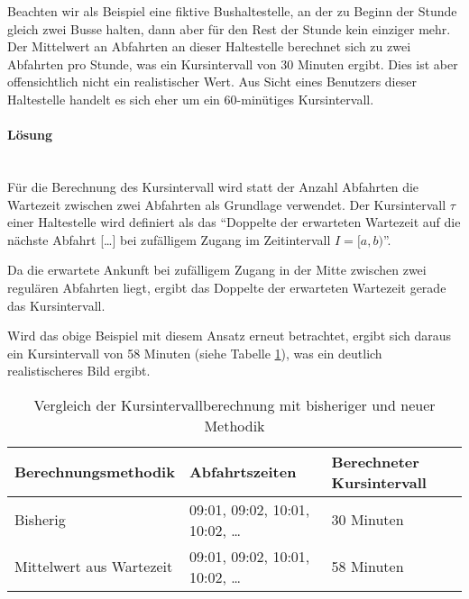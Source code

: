 Beachten wir als Beispiel eine fiktive Bushaltestelle, an der zu Beginn der Stunde gleich zwei Busse halten, dann aber für den Rest der Stunde kein einziger mehr.
Der Mittelwert an Abfahrten an dieser \gls{Haltestelle} berechnet sich zu zwei Abfahrten pro Stunde, was ein Kursintervall von 30 Minuten ergibt.
Dies ist aber offensichtlich nicht ein realistischer Wert.
Aus Sicht eines Benutzers dieser \gls{Haltestelle} handelt es sich eher um ein 60-minütiges Kursintervall.

\paragraph{Lösung}~\\
Für die Berechnung des Kursintervall wird statt der Anzahl Abfahrten die Wartezeit zwischen zwei Abfahrten als Grundlage verwendet.
Der Kursintervall $\tau$ einer \gls{Haltestelle} wird definiert als das "`Doppelte der erwarteten Wartezeit auf die nächste Abfahrt [\ldots] bei zufälligem Zugang im Zeitintervall $I = [a,b)$"'.~\cite{visum_manual_formula}

Da die erwartete Ankunft bei zufälligem Zugang in der Mitte zwischen zwei regulären Abfahrten liegt, ergibt das Doppelte der erwarteten Wartezeit gerade das Kursintervall.

Wird das obige Beispiel mit diesem Ansatz erneut betrachtet, ergibt sich daraus ein Kursintervall von 58 Minuten (siehe Tabelle \ref{table:Vergleich der Kursintervallberechnung mit bisheriger und neuer Methodik}), was ein deutlich realistischeres Bild ergibt.

\begin{table}[ht]
    \centering
    \begin{tabular}[c]{l l l}
        \toprule
        \textbf{Berechnungsmethodik}
                                    & \textbf{Abfahrtszeiten}
                                    & \textbf{Berechneter Kursintervall}\\
        \midrule
        Bisherig
                                    & 09:01, 09:02, 10:01, 10:02, \dots
                                    & 30 Minuten\\
        Mittelwert aus Wartezeit    & 09:01, 09:02, 10:01, 10:02, \dots
                                    & 58 Minuten\\
        \bottomrule
    \end{tabular}
    \caption{Vergleich der Kursintervallberechnung mit bisheriger und neuer Methodik}
    \label{table:Vergleich der Kursintervallberechnung mit bisheriger und neuer Methodik}
\end{table}

